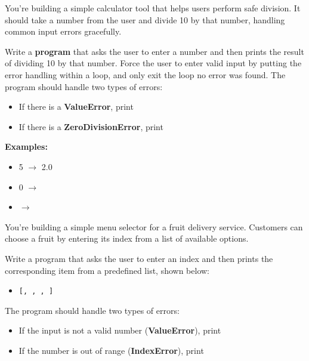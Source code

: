 

	\item 
		You're building a simple calculator tool that helps users perform safe division.  
		It should take a number from the user and divide 10 by that number, handling common 
		input errors gracefully. 

		Write a \textbf{program} that asks the user to enter a number and then prints the 
		result of dividing 10 by that number.  Force the user to enter valid input by 
		putting the error handling within a loop, and only exit the loop no error was found.
		The program should handle two types of errors:
		\begin{itemize}
			\item If there is a \textbf{ValueError}, print 
			\item If there is a \textbf{ZeroDivisionError}, print 
		\end{itemize}

		\textbf{Examples:}
		\begin{itemize}
			\item {} 5 $\rightarrow$ 2.0
			\item {} 0 $\rightarrow$ 
			\item {}  $\rightarrow$ 
		\end{itemize}









	\item 
		You're building a simple menu selector for a fruit delivery service.  
		Customers can choose a fruit by entering its index from a list of available options.

		Write a program that asks the user to enter an index and then prints the 
		corresponding item from a predefined list, shown below:
		\begin{itemize}
			\item \texttt{[, , , ]}
		\end{itemize}
		The program should handle two types of errors:
		\begin{itemize}
			\item If the input is not a valid number (\textbf{ValueError}), 
				print 
			\item If the number is out of range (\textbf{IndexError}), 
				print 
		\end{itemize}

